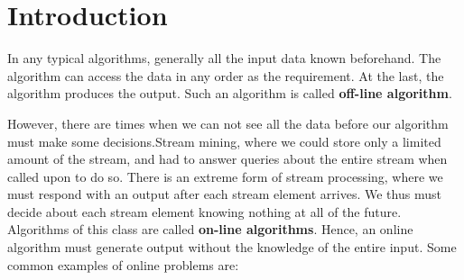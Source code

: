 \documentclass[conference,compsoc]{IEEEtran}
\begin{document}




\maketitle






%
\IEEEpeerreviewmaketitle



\section{Introduction}
In any typical algorithms, generally all the input data known beforehand. The algorithm can access the data in any order as the requirement. At the last, the algorithm produces the output. Such an algorithm is called \textbf{off-line algorithm}. \par
However, there are times when we can not see all the data before our algorithm must make some decisions.Stream mining, where we could store only a limited amount of the stream, and had to answer queries about the entire stream when called upon to do so. There is an extreme form of stream processing, where we must respond with an output after each stream element arrives. We thus must decide about each stream element knowing nothing at all of the future. Algorithms of this class are called \textbf{on-line algorithms}. Hence, an online algorithm must generate output without the knowledge of the entire input. Some common examples of online problems are:
\end{document}
